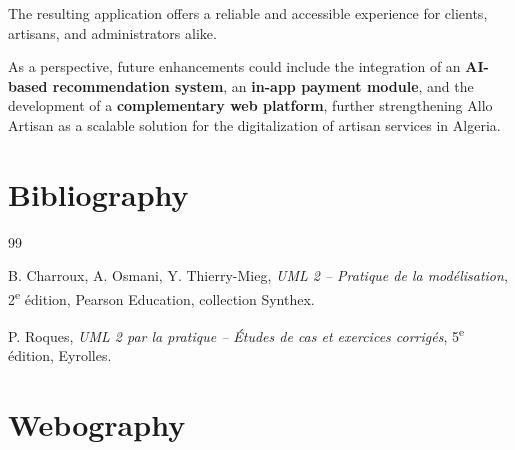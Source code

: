 \documentclass[12pt,a4paper]{report}
\begin{document}
\vspace{0.3cm}

The resulting application offers a reliable and accessible experience for clients, artisans, and administrators alike.

\vspace{0.3cm}

As a perspective, future enhancements could include the integration of an \textbf{AI-based recommendation system}, an \textbf{in-app payment module}, and the development of a \textbf{complementary web platform}, further strengthening Allo Artisan as a scalable solution for the digitalization of artisan services in Algeria.


\clearpage
\chapter*{Bibliography}
\thispagestyle{empty}

\begin{thebibliography}{99}

B. Charroux, A. Osmani, Y. Thierry-Mieg,
\textit{UML 2 -- Pratique de la modélisation},
2\textsuperscript{e} édition,
Pearson Education, collection Synthex.

P. Roques,
\textit{UML 2 par la pratique -- Études de cas et exercices corrigés},
5\textsuperscript{e} édition,
Eyrolles.

\end{thebibliography}


\clearpage
\chapter*{Webography}
\thispagestyle{empty}
\end{document}
